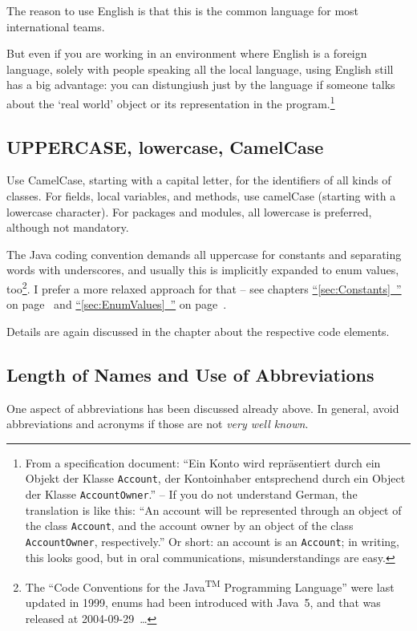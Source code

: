 \documentclass[11pt,a4paper, titlepage, parskip=half, headsepline, footsepline, cleardoublepage=current, headheight=1cm]{scrbook}
\newcommand*{\tqfullvref}[1]{\hyperref[{#1}]{“\ref*{#1}~\nameref*{#1}”} on page~\pageref{#1}}
\begin{document}
The reason to use English is that this is the common language for most international teams.

But even if you are working in an environment where English is a foreign language, solely with people speaking all the local language, using English still has a big advantage: you can distungiush just by the language if someone talks about the ‘real world’ object or its representation in the program.\footnote{From a specification document: “Ein Konto wird repräsentiert durch ein Objekt der Klasse \lstinline|Account|, der Kontoinhaber entsprechend durch ein Object der Klasse \lstinline|AccountOwner|.” – If you do not understand German, the translation is like this: “An account will be represented through an object of the class \lstinline|Account|, and the account owner by an object of the class \lstinline|AccountOwner|, respectively.” Or short: an account is an \lstinline|Account|; in writing, this looks good, but in oral communications, misunderstandings are easy. }

\subsection{UPPERCASE, lowercase, CamelCase}
Use CamelCase, starting with a capital letter, for the identifiers of all kinds of classes. For fields, local variables, and methods, use camelCase (starting with a lowercase character). For packages and modules, all lowercase is preferred, although not mandatory.

The Java coding convention \autocite{SUN_CODE_CONVENTIONS} demands all uppercase for constants and separating words with underscores, and usually this is implicitly expanded to enum values, too\footnote{The “Code Conventions for the Java\textsuperscript{TM} Programming Language” \autocite{SUN_CODE_CONVENTIONS} were last updated in 1999, enums had been introduced with Java~5, and that was released at 2004-09-29~…}. I prefer a more relaxed approach for that – see chapters \tqfullvref{sec:Constants} and \tqfullvref{sec:EnumValues}.

Details are again discussed in the chapter about the respective code elements.

\subsection{Length of Names and Use of Abbreviations}\label{sec:LengthOfNamesAndUseOfAbbreviations}
One aspect of abbreviations has been discussed already above. In general, avoid abbreviations and acronyms if those are not \textit{very well known}.
\end{document}
